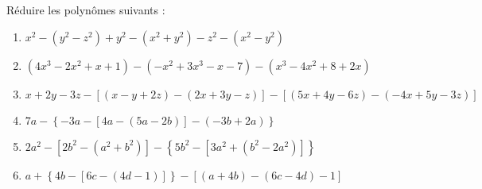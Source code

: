 \begin{exercice}
Réduire les polynômes suivants :
\begin{enumerate}
\item ${{x}^{2}}-\left( {{y}^{2}}-{{z}^{2}} \right)+{{y}^{2}}-\left( {{x}^{2}}+{{y}^{2}} \right)-{{z}^{2}}-\left( {{x}^{2}}-{{y}^{2}} \right)$
\item $\left( 4{{x}^{3}}-2{{x}^{2}}+x+1 \right)-\left( -{{x}^{2}}+3{{x}^{3}}-x-7 \right)-\left( {{x}^{3}}-4{{x}^{2}}+8+2x \right)$
\item $x+2y-3z-\left[ \left( x-y+2z \right)-\left( 2x+3y-z \right) \right]-\left[ \left( 5x+4y-6z \right)-\left( -4x+5y-3z \right) \right]$
\item $7a-\left\{ -3a-\left[ 4a-\left( 5a-2b \right) \right]-\left( -3b+2a \right) \right\}$
\item $2{{a}^{2}}-\left[ 2{{b}^{2}}-\left( {{a}^{2}}+{{b}^{2}} \right) \right]-\left\{ 5{{b}^{2}}-\left[ 3{{a}^{2}}+\left( {{b}^{2}}-2{{a}^{2}} \right) \right] \right\}$
\item $a+\left\{ 4b-\left[ 6c-\left( 4d-1 \right) \right] \right\}-\left[ \left( a+4b \right)-\left( 6c-4d \right)-1 \right]$
\end{enumerate}
\end{exercice}

